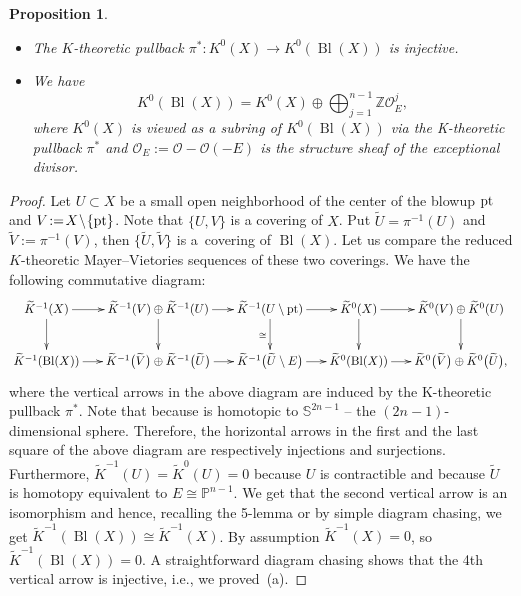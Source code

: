 \documentclass[pdftex]{sigma}
\numberwithin{equation}{section}
\newtheorem{Proposition}[Theorem]{Proposition}
\newcommand{\ZZ}{\mathbb{Z}}
\newcommand{\PP}{\mathbb{P}}
\renewcommand{\O}{\mathcal{O}}
\begin{document}
\begin{Proposition}\label{prop:K}\quad
\begin{itemize}
\item[$(a)$] The $K$-theoretic pullback $\pi^*\colon K^0(X)\to K^0(\operatorname{Bl}(X))$
 is injective.
\item[$(b)$] We have
 \[
 K^0(\operatorname{Bl}(X)) = K^0(X) \oplus \bigoplus_{j=1}^{n-1} \ZZ
 \O_E^j,
 \]
 where $K^0(X)$ is viewed as a subring of $K^0(\operatorname{Bl}(X)) $ via
 the K-theoretic pullback $\pi^*$ and $\O_E:=\O-\O(-E)$ is the
 structure sheaf of the exceptional divisor.
\end{itemize}
\end{Proposition}
\begin{proof}
Let $U\!\subset \!X$ be a small open neighborhood of the center of the
blowup ${\rm pt}$ and ${V\!:=\!X\!\setminus\!{\{{\rm pt}\}}}$. Note that
$\{U,V\}$ is a covering of $X$. Put $\widetilde{U}=\pi^{-1}(U)$ and
$\widetilde{V}:=\pi^{-1}(V)$, then $\big\{\widetilde{U},\widetilde{V}\big\}$
is a~covering of $\operatorname{Bl}(X)$. Let us compare the reduced $K$-theoretic
Mayer--Vietories sequences of these two coverings. We have the
following commutative diagram:
$$
\xymatrix@C=1.6em{
 \widetilde{K}^{-1}(X)\ar[r]\ar[d] &
 \widetilde{K}^{-1}(V)\oplus \widetilde{K}^{-1}(U) \ar[r]\ar[d] &
 \widetilde{K}^{-1}(U\setminus{{\rm pt}}) \ar[r]\ar[d]_{\cong}&
\widetilde{K}^{0}(X)\ar[r]\ar[d] &
 \widetilde{K}^0(V)\oplus \widetilde{K}^0(U) \ar[d]
\\
 \widetilde{K}^{-1}(\operatorname{Bl}(X))\ar[r] &
 \widetilde{ K}^{-1}\big(\widetilde{V}\big)\oplus\widetilde{ K}^{-1}\big(\widetilde{U}\big) \ar[r] &
\widetilde{ K}^{-1}\big(\widetilde{U}\setminus{E}\big) \ar[r]&
\widetilde{K}^{0}(\operatorname{Bl}(X))\ar[r] &
 \widetilde{ K}^0\big(\widetilde{V}\big)\oplus\widetilde{ K}^0\big(\widetilde{U}\big), }
$$
where the vertical
arrows in the above diagram are induced by the K-theoretic pullback
$\pi^*$. Note that
 because
 is
homotopic to $\mathbb{S}^{2n-1}$ -- the $(2n-1)$-dimensional sphere. Therefore, the horizontal arrows in the first and the last square of the above diagram are respectively injections and surjections.
Furthermore, $\widetilde{K}^{-1}(U)=\widetilde{K}^{0}(U)=0$ because $U$
is contractible and  because
$\widetilde{U}$ is homotopy equivalent to $E\cong \PP^{n-1}$. We get
that the second vertical arrow is an isomorphism  and hence, recalling the 5-lemma or by simple diagram chasing, we get
$\widetilde{K}^{-1}(\operatorname{Bl}(X)) \cong \widetilde{K}^{-1}(X)$. By assumption $\widetilde{K}^{-1}(X)=0$, so $\widetilde{K}^{-1}(\operatorname{Bl}(X)) =0$. A
straightforward diagram chasing shows that the 4th vertical arrow is
injective, i.e., we proved~(a).


\end{proof}
\end{document}
